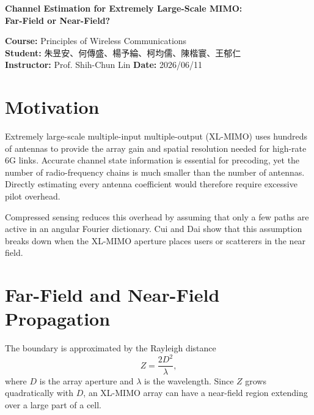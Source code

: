\documentclass[12pt,a4paper]{article}
\newcommand{\tightsection}[1]{\section{#1}\vspace{-0.35em}}
\newcommand{\infofield}[2]{\textbf{#1:} #2\hfill}
\begin{document}
\begin{center}
  {\Large\bfseries Channel Estimation for Extremely Large-Scale MIMO:\\
  Far-Field or Near-Field?}

  \vspace{0.55em}
  \infofield{Course}{Principles of Wireless Communications}\\[0.35em]
  \infofield{Student}{{\chinesefont
  朱昱安、何傳盛、楊予綸、柯均儒、陳楷寰、王郁仁}}\\[0.35em]
  \infofield{Instructor}{Prof. Shih-Chun Lin}
  \infofield{Date}{2026/06/11}
\end{center}

\vspace{-0.45em}
\tightsection{Motivation}

Extremely large-scale multiple-input multiple-output (XL-MIMO) uses
hundreds of antennas to provide the array gain and spatial resolution
needed for high-rate 6G links. Accurate channel state information is
essential for precoding, yet the number of radio-frequency chains is much
smaller than the number of antennas. Directly estimating every antenna
coefficient would therefore require excessive pilot overhead.

Compressed sensing reduces this overhead by assuming that only a few paths
are active in an angular Fourier dictionary. Cui and Dai show that this
assumption breaks down when the XL-MIMO aperture places users or scatterers
in the near field.

\tightsection{Far-Field and Near-Field Propagation}

The boundary is approximated by the Rayleigh distance
\begin{equation}
  Z=\frac{2D^2}{\lambda},
  \label{eq:rayleigh}
\end{equation}
where $D$ is the array aperture and $\lambda$ is the wavelength. Since
$Z$ grows quadratically with $D$, an XL-MIMO array can have a near-field
region extending over a large part of a cell.
\end{document}
